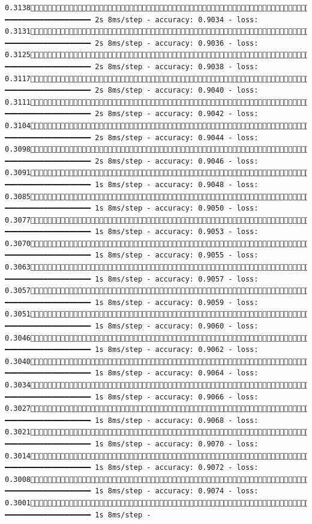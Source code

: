 \documentclass[
  letterpaper,
  DIV=11,
  numbers=noendperiod]{scrreprt}
\begin{document}
\begin{verbatim}
0.31381591/1875 ━━━━━━━━━━━━━━━━━━━━ 2s 8ms/step - accuracy: 0.9034 - loss: 0.31311597/1875 ━━━━━━━━━━━━━━━━━━━━ 2s 8ms/step - accuracy: 0.9036 - loss: 0.31251604/1875 ━━━━━━━━━━━━━━━━━━━━ 2s 8ms/step - accuracy: 0.9038 - loss: 0.31171610/1875 ━━━━━━━━━━━━━━━━━━━━ 2s 8ms/step - accuracy: 0.9040 - loss: 0.31111616/1875 ━━━━━━━━━━━━━━━━━━━━ 2s 8ms/step - accuracy: 0.9042 - loss: 0.31041622/1875 ━━━━━━━━━━━━━━━━━━━━ 2s 8ms/step - accuracy: 0.9044 - loss: 0.30981629/1875 ━━━━━━━━━━━━━━━━━━━━ 2s 8ms/step - accuracy: 0.9046 - loss: 0.30911635/1875 ━━━━━━━━━━━━━━━━━━━━ 1s 8ms/step - accuracy: 0.9048 - loss: 0.30851642/1875 ━━━━━━━━━━━━━━━━━━━━ 1s 8ms/step - accuracy: 0.9050 - loss: 0.30771649/1875 ━━━━━━━━━━━━━━━━━━━━ 1s 8ms/step - accuracy: 0.9053 - loss: 0.30701656/1875 ━━━━━━━━━━━━━━━━━━━━ 1s 8ms/step - accuracy: 0.9055 - loss: 0.30631662/1875 ━━━━━━━━━━━━━━━━━━━━ 1s 8ms/step - accuracy: 0.9057 - loss: 0.30571668/1875 ━━━━━━━━━━━━━━━━━━━━ 1s 8ms/step - accuracy: 0.9059 - loss: 0.30511673/1875 ━━━━━━━━━━━━━━━━━━━━ 1s 8ms/step - accuracy: 0.9060 - loss: 0.30461679/1875 ━━━━━━━━━━━━━━━━━━━━ 1s 8ms/step - accuracy: 0.9062 - loss: 0.30401685/1875 ━━━━━━━━━━━━━━━━━━━━ 1s 8ms/step - accuracy: 0.9064 - loss: 0.30341692/1875 ━━━━━━━━━━━━━━━━━━━━ 1s 8ms/step - accuracy: 0.9066 - loss: 0.30271698/1875 ━━━━━━━━━━━━━━━━━━━━ 1s 8ms/step - accuracy: 0.9068 - loss: 0.30211705/1875 ━━━━━━━━━━━━━━━━━━━━ 1s 8ms/step - accuracy: 0.9070 - loss: 0.30141712/1875 ━━━━━━━━━━━━━━━━━━━━ 1s 8ms/step - accuracy: 0.9072 - loss: 0.30081719/1875 ━━━━━━━━━━━━━━━━━━━━ 1s 8ms/step - accuracy: 0.9074 - loss: 0.30011726/1875 ━━━━━━━━━━━━━━━━━━━━ 1s 8ms/step - 
\end{verbatim}
\end{document}
